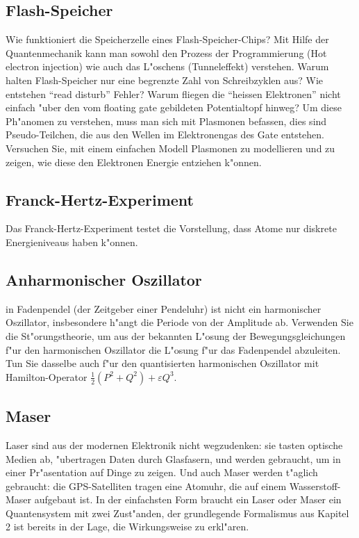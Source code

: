 \subsection{Flash-Speicher}
Wie funktioniert die Speicherzelle eines Flash-Speicher-Chips? Mit
Hilfe der Quantenmechanik kann man sowohl den Prozess der Programmierung
(Hot electron injection) wie auch das L"oschens (Tunneleffekt)
verstehen. Warum halten Flash-Speicher nur eine begrenzte Zahl von
Schreibzyklen aus? Wie entstehen ``read disturb'' Fehler?
Warum fliegen die ``heissen Elektronen'' nicht einfach "uber den
vom floating gate gebildeten Potentialtopf hinweg? 
Um diese Ph"anomen zu verstehen, muss man sich mit Plasmonen befassen,
dies sind Pseudo-Teilchen, die aus den Wellen im Elektronengas des
Gate entstehen. Versuchen Sie, mit einem einfachen Modell Plasmonen
zu modellieren und zu zeigen, wie diese den Elektronen Energie entziehen
k"onnen.

\subsection{Franck-Hertz-Experiment}
Das Franck-Hertz-Experiment testet die Vorstellung, dass Atome nur
diskrete Energieniveaus haben k"onnen.

\subsection{Anharmonischer Oszillator}
in Fadenpendel (der Zeitgeber einer Pendeluhr) ist nicht ein
harmonischer Oszillator, insbesondere h"angt die Periode von der
Amplitude ab. Verwenden Sie die St"orungstheorie, um aus der bekannten
L"osung der Bewegungsgleichungen f"ur den harmonischen Oszillator die
L"osung f"ur das Fadenpendel abzuleiten. Tun Sie dasselbe auch f"ur
den quantisierten harmonischen Oszillator mit Hamilton-Operator
$\frac12 (P^2+Q^2)+\varepsilon Q^3$.

\subsection{Maser}
Laser sind aus der modernen Elektronik nicht wegzudenken: sie tasten
optische Medien ab, "ubertragen Daten durch Glasfasern, und werden
gebraucht, um in einer Pr"asentation auf Dinge zu zeigen. Und auch
Maser werden t"aglich gebraucht: die GPS-Satelliten tragen eine
Atomuhr, die auf einem Wasserstoff-Maser aufgebaut ist. In der
einfachsten Form braucht ein Laser oder Maser ein Quantensystem mit
zwei Zust"anden, der grundlegende Formalismus aus Kapitel 2 ist
bereits in der Lage, die Wirkungsweise zu erkl"aren.

